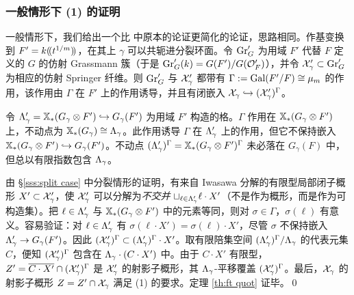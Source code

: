 \subsubsection{一般情形下 (1) 的证明} 一般情形下，我们给出一个比 \cite{KL} 中原本的论证更简化的论证，思路相同。作基变换到 $F'=k(\!(t^{1/m})\!)$，在其上 $\gamma$ 可以共轭进分裂环面。令 $\textup{Gr}'_{G}$ 为用域 $F'$ 代替 $F$ 定义的 $G$ 的仿射 Grassmann 簇（于是 $\textup{Gr}'_{G}(k)=G(F')/G(\mathcal{O}'_{F})$），并令 $\mathcal{X}'_{\gamma}\subset\textup{Gr}'_{G}$ 为相应的仿射 Springer 纤维。则 $\textup{Gr}'_{G}$ 与 $\mathcal{X}'_{\gamma}$ 都带有 $\Gamma:=\textup{Gal}(F'/F)\cong\mu_{m}$ 的作用，该作用由 $\Gamma$ 在 $F'$ 上的作用诱导，并且有闭嵌入 $\mathcal{X}_{\gamma}\hookrightarrow (\mathcal{X}'_{\gamma})^{\Gamma}$。

令 $\Lambda'_{\gamma}=\mathbb{X}_*(G_{\gamma}\otimes F')\hookrightarrow G_{\gamma}(F')$ 为用域 $F'$ 构造的格。$\Gamma$ 作用在 $\mathbb{X}_*(G_{\gamma}\otimes F')$ 上，不动点为 $\mathbb{X}_*(G_{\gamma})\cong \Lambda_{\gamma}$。此作用诱导 $\Gamma$ 在 $\Lambda'_{\gamma}$ 上的作用，但它不保持嵌入 $\mathbb{X}_*(G_{\gamma}\otimes F')\hookrightarrow G_{\gamma}(F')$。不动点 $(\Lambda'_{\gamma})^{\Gamma}=\mathbb{X}_*(G_{\gamma}\otimes F')^{\Gamma}$ 未必落在 $G_{\gamma}(F)$ 中，但总以有限指数包含 $\Lambda_{\gamma}$。

由 \S\ref{sss:split case} 中分裂情形的证明，有来自 Iwasawa 分解的有限型局部闭子概形 $X'\subset\mathcal{X}'_{\gamma}$，使 $\mathcal{X}'_{\gamma}$ 可以分解为{\em 不交并} $\sqcup_{\ell\in\Lambda'_{\gamma}}\ell\cdot X'$（不是作为概形，而是作为可构造集）。把 $\ell\in \Lambda'_{\gamma}$ 与 $\mathbb{X}_*(G_{\gamma}\otimes F')$ 中的元素等同，则对 $\sigma\in\Gamma$，$\sigma(\ell)$ 有意义。容易验证：对 $\ell\in\Lambda'_{\gamma}$ 有 $\sigma(\ell\cdot X')=\sigma(\ell)\cdot X'$，尽管 $\sigma$ 不保持嵌入 $\Lambda'_{\gamma}\to G_{\gamma}(F')$。因此 $(\mathcal{X}'_{\gamma})^{\Gamma}\subset (\Lambda'_{\gamma})^{\Gamma}\cdot X'$。取有限陪集空间 $(\Lambda'_{\gamma})^{\Gamma}/\Lambda_{\gamma}$ 的代表元集 $C$，便知 $(\mathcal{X}'_{\gamma})^{\Gamma}$ 包含在 $\Lambda_{\gamma}\cdot (C\cdot X')$ 中。由于 $C\cdot X'$ 有限型，$Z'=\overline{C\cdot X'}\cap (\mathcal{X}'_{\gamma})^{\Gamma}$ 是 $\mathcal{X}'_{\gamma}$ 的射影子概形，其 $\Lambda_{\gamma}$-平移覆盖 $(\mathcal{X}'_{\gamma})^{\Gamma}$。最后，$\mathcal{X}_{\gamma}$ 的射影子概形 $Z=Z'\cap \mathcal{X}_{\gamma}$ 满足 (1) 的要求。定理 \ref{th:ft quot} 证毕。\qed

